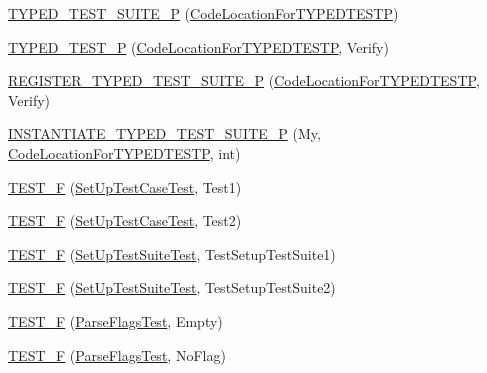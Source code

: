 \begin{DoxyCompactItemize}
\item 
\mbox{\hyperlink{namespacetesting_ab6095d387aee3b6b71919177827e78f5}{T\+Y\+P\+E\+D\+\_\+\+T\+E\+S\+T\+\_\+\+S\+U\+I\+T\+E\+\_\+P}} (\mbox{\hyperlink{classtesting_1_1_code_location_for_t_y_p_e_d_t_e_s_t_p}{Code\+Location\+For\+T\+Y\+P\+E\+D\+T\+E\+S\+TP}})
\item 
\mbox{\hyperlink{namespacetesting_a3f3fbbc7ecc23117307b81deb8f4cfac}{T\+Y\+P\+E\+D\+\_\+\+T\+E\+S\+T\+\_\+P}} (\mbox{\hyperlink{classtesting_1_1_code_location_for_t_y_p_e_d_t_e_s_t_p}{Code\+Location\+For\+T\+Y\+P\+E\+D\+T\+E\+S\+TP}}, Verify)
\item 
\mbox{\hyperlink{namespacetesting_ac025be5150f4d250cfd8136063e2f2a1}{R\+E\+G\+I\+S\+T\+E\+R\+\_\+\+T\+Y\+P\+E\+D\+\_\+\+T\+E\+S\+T\+\_\+\+S\+U\+I\+T\+E\+\_\+P}} (\mbox{\hyperlink{classtesting_1_1_code_location_for_t_y_p_e_d_t_e_s_t_p}{Code\+Location\+For\+T\+Y\+P\+E\+D\+T\+E\+S\+TP}}, Verify)
\item 
\mbox{\hyperlink{namespacetesting_abc73aa914fde88c645367f862dbe81dd}{I\+N\+S\+T\+A\+N\+T\+I\+A\+T\+E\+\_\+\+T\+Y\+P\+E\+D\+\_\+\+T\+E\+S\+T\+\_\+\+S\+U\+I\+T\+E\+\_\+P}} (My, \mbox{\hyperlink{classtesting_1_1_code_location_for_t_y_p_e_d_t_e_s_t_p}{Code\+Location\+For\+T\+Y\+P\+E\+D\+T\+E\+S\+TP}}, int)
\item 
\mbox{\hyperlink{namespacetesting_a01e948eb5427d31f70eafaf472e2bfa8}{T\+E\+S\+T\+\_\+F}} (\mbox{\hyperlink{classtesting_1_1_set_up_test_case_test}{Set\+Up\+Test\+Case\+Test}}, Test1)
\item 
\mbox{\hyperlink{namespacetesting_a8fc2e448ce96e4da357a2129d49e86e3}{T\+E\+S\+T\+\_\+F}} (\mbox{\hyperlink{classtesting_1_1_set_up_test_case_test}{Set\+Up\+Test\+Case\+Test}}, Test2)
\item 
\mbox{\hyperlink{namespacetesting_a071d841c6f97de4f9fd502ed3c24c017}{T\+E\+S\+T\+\_\+F}} (\mbox{\hyperlink{classtesting_1_1_set_up_test_suite_test}{Set\+Up\+Test\+Suite\+Test}}, Test\+Setup\+Test\+Suite1)
\item 
\mbox{\hyperlink{namespacetesting_a505d03ad8946d9a4598f8a6754bd2172}{T\+E\+S\+T\+\_\+F}} (\mbox{\hyperlink{classtesting_1_1_set_up_test_suite_test}{Set\+Up\+Test\+Suite\+Test}}, Test\+Setup\+Test\+Suite2)
\item 
\mbox{\hyperlink{namespacetesting_a9072b690c3c0e3b6af327fa72fe821c4}{T\+E\+S\+T\+\_\+F}} (\mbox{\hyperlink{classtesting_1_1_parse_flags_test}{Parse\+Flags\+Test}}, Empty)
\item 
\mbox{\hyperlink{namespacetesting_ab2b5d94a0dd45cb06473bdd7900e23af}{T\+E\+S\+T\+\_\+F}} (\mbox{\hyperlink{classtesting_1_1_parse_flags_test}{Parse\+Flags\+Test}}, No\+Flag)

\end{DoxyCompactItemize}
